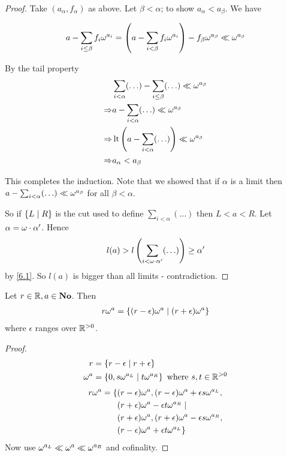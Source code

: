 \begin{proof}
Take $(a_\alpha, f_\alpha)$ as above.
Let $\beta < \alpha$; to show $a_\alpha < a_\beta$.
We have

\begin{align*}
	a - \sum_{i \leq \beta} f_i \omega^{a_i} = \left( a - \sum_{i < \beta} f_i\omega^{a_i} \right) - f_\beta\omega^{a_\beta} \ll \omega^{a_\beta}
\end{align*}

By the tail property
\begin{align*}
	&\sum_{i < \alpha} (\ldots) - \sum_{i \leq \beta} (\ldots) \ll \omega^{a_\beta} \\
	\Rightarrow &a - \sum_{i < \alpha} (\ldots) \ll \omega^{a_\beta} \\
	\Rightarrow &\operatorname{lt}\left( a - \sum_{i < \alpha} (\ldots)  \right) \ll \omega^{a_\beta} \\
	\Rightarrow &a_\alpha < a_\beta
\end{align*}

This completes the induction.
Note that we showed that if $\alpha$ is a limit then $a - \sum_{i < \alpha} (\ldots) \ll \omega^{a_\beta}$ for all $\beta < \alpha$.

So if $\left\{ L \mid R \right\}$ is the cut used to define $\sum_{i < \alpha} (\ldots)$ then $L < a < R$.
Let $\alpha = \omega \cdot \alpha'$.
Hence 
\begin{align*}
	l(a) > l\left( \sum_{i < \omega\cdot\alpha'} (\ldots) \right) \geq \alpha'
\end{align*}
by \eqref{6.1}.
So $l(a)$ is bigger than all limits - contradiction.
\end{proof}

\begin{lemma} \label{6.4}%
Let $r \in \mathbb{R}, a \in \mathbf{No}$. Then 
\begin{align*}
	r\omega^a = \{(r - \epsilon) \omega^a \mid (r+\epsilon)\omega^a\}
\end{align*}
where $\epsilon$ ranges over $\mathbb{R}^{>0}$.
 \end{lemma}

\begin{proof} %
\begin{align*}
	r &= \{r - \epsilon \mid r + \epsilon\} \\
	\omega^a &= \left\{ 0, s\omega^{a_L} \mid t\omega^{a_R} \right\} \text{ where } s,t \in \mathbb{R}^{>0}
\end{align*}
\begin{align*}
	r\omega^a = \{
	&(r - \epsilon) \omega^a, (r - \epsilon)\omega^a + \epsilon s \omega^{a_L}, \\
	&(r + \epsilon) \omega^a - \epsilon t \omega^{a_R} \mid \\
	&(r + \epsilon) \omega^a, (r + \epsilon)\omega^a - \epsilon s \omega^{a_R}, \\
	&(r - \epsilon) \omega^a + \epsilon t \omega^{a_L} \}
\end{align*}
Now use $\omega^{a_L} \ll \omega^a \ll \omega^{a_R}$ and cofinality.
 \end{proof}

